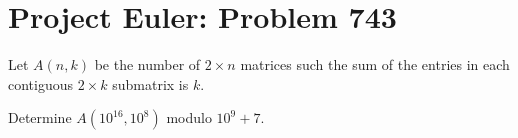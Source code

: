 \documentclass[a4paper, 12pt]{article}
\begin{document}
\section*{Project Euler: Problem 743}

\begin{sidebox}
    \begin{problem}
        Let \( A(n, k) \) be the number of \( 2 \times n \) matrices such the sum of the entries in each contiguous \( 2 \times k \) submatrix is \( k \).

        \vspace{0.3cm}

        Determine \( A(10^{16}, 10^8) \) modulo \( 10^9 + 7 \).
    \end{problem}
\end{sidebox}
\end{document}

